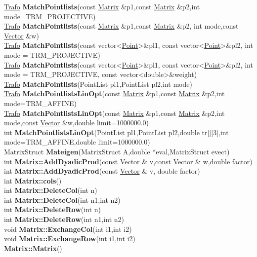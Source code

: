 \documentclass[10pt,titlepage]{article}
\def\functionlistentry#1#2#3#4#5#6{\noindent #1 {\bf #2}(#3) \dotfill #6\\}
\begin{document}
{{\functionlistentry{\hyperlink{Trafo}{Trafo}}{MatchPointlists}{const \hyperlink{Matrix}{Matrix} \&p1,const \hyperlink{Matrix}{Matrix} \&p2,int mode=TRM\_PROJECTIVE}{1244}{registration}{}
\functionlistentry{\hyperlink{Trafo}{Trafo}}{MatchPointlists}{const \hyperlink{Matrix}{Matrix} \&p1,const \hyperlink{Matrix}{Matrix} \&p2, int mode,const \hyperlink{Vector}{Vector} \&w}{1245}{registration}{}
\functionlistentry{\hyperlink{Trafo}{Trafo}}{MatchPointlists}{const vector\textless {}\hyperlink{Point}{Point}\textgreater  \&pl1, const vector\textless {}\hyperlink{Point}{Point}\textgreater  \&pl2, int mode = TRM\_PROJECTIVE}{1246}{registration}{}
\functionlistentry{\hyperlink{Trafo}{Trafo}}{MatchPointlists}{const vector\textless {}\hyperlink{Point}{Point}\textgreater  \&pl1, const vector\textless {}\hyperlink{Point}{Point}\textgreater  \&pl2, int mode = TRM\_PROJECTIVE, const vector\textless {}double\textgreater  \&weight}{1247}{registration}{}
\functionlistentry{\hyperlink{Trafo}{Trafo}}{MatchPointlists}{PointList pl1,PointList pl2,int mode}{1248}{registration}{}
\functionlistentry{\hyperlink{Trafo}{Trafo}}{MatchPointlistsLinOpt}{const \hyperlink{Matrix}{Matrix} \&p1,const \hyperlink{Matrix}{Matrix} \&p2,int mode=TRM\_AFFINE}{1249}{registration}{}
\functionlistentry{\hyperlink{Trafo}{Trafo}}{MatchPointlistsLinOpt}{const \hyperlink{Matrix}{Matrix} \&p1,const \hyperlink{Matrix}{Matrix} \&p2,int mode,const \hyperlink{Vector}{Vector} \&w,double limit=1000000.0}{1250}{registration}{}
\functionlistentry{int}{MatchPointlistsLinOpt}{PointList pl1,PointList pl2,double tr[][3],int mode=TRM\_AFFINE,double limit=1000000.0}{1251}{registration}{}
\functionlistentry{MatrixStruct}{Mateigen}{MatrixStruct A,double *eval,MatrixStruct evect}{1134}{matrixAlgebra}{}
\functionlistentry{int}{Matrix::AddDyadicProd}{const \hyperlink{Vector}{Vector} \& v,const \hyperlink{Vector}{Vector} \& w,double factor}{276}{datastructures}{}
\functionlistentry{int}{Matrix::AddDyadicProd}{const \hyperlink{Vector}{Vector} \& v, double factor}{277}{datastructures}{}
\functionlistentry{int}{Matrix::cols}{}{265}{datastructures}{}
\functionlistentry{int}{Matrix::DeleteCol}{int n}{271}{datastructures}{}
\functionlistentry{int}{Matrix::DeleteCol}{int n1,int n2}{272}{datastructures}{}
\functionlistentry{int}{Matrix::DeleteRow}{int n}{269}{datastructures}{}
\functionlistentry{int}{Matrix::DeleteRow}{int n1,int n2}{270}{datastructures}{}
\functionlistentry{void}{Matrix::ExchangeCol}{int i1,int i2}{268}{datastructures}{}
\functionlistentry{void}{Matrix::ExchangeRow}{int i1,int i2}{267}{datastructures}{}
\functionlistentry{}{Matrix::Matrix}{}{255}{datastructures}{}
}}
\end{document}
